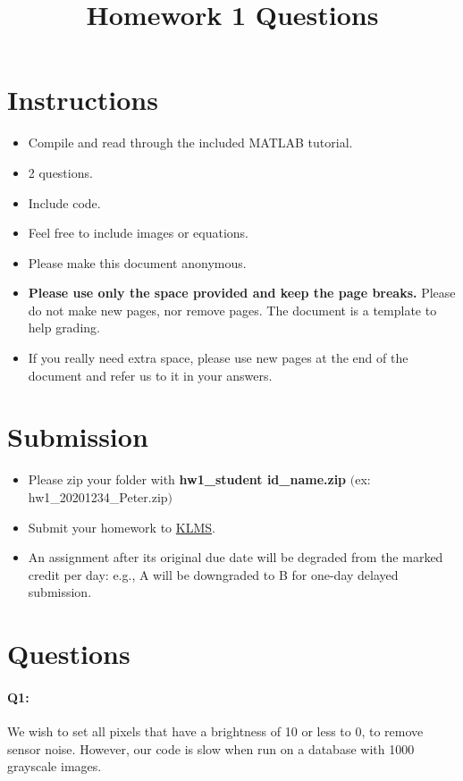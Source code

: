 \documentclass[11pt]{article}
\date{}
\title{\vspace{-1cm}Homework 1 Questions}
\begin{document}
\maketitle
\vspace{-2cm}
\thispagestyle{fancy}

\section*{Instructions}
\begin{itemize}
  \item Compile and read through the included MATLAB tutorial.
  \item 2 questions.
  \item Include code.
  \item Feel free to include images or equations.
  \item Please make this document anonymous.
  \item \textbf{Please use only the space provided and keep the page breaks.} Please do not make new pages, nor remove pages. The document is a template to help grading.
  \item If you really need extra space, please use new pages at the end of the document and refer us to it in your answers.
\end{itemize}


\section*{Submission}
\begin{itemize}
	\item Please zip your folder with \textbf{hw1\_student id\_name.zip} $($ex: hw1\_20201234\_Peter.zip$)$
	\item Submit your homework to \href{http://klms.kaist.ac.kr/course/view.php?id=109597}{KLMS}.
	\item An assignment after its original due date will be degraded from the marked credit per day: e.g., A will be downgraded to B for one-day delayed submission.
\end{itemize}

\pagebreak


\section*{Questions}



\paragraph{Q1:} We wish to set all pixels that have a brightness of 10 or less to 0, to remove sensor noise. However, our code is slow when run on a database with 1000 grayscale images.
\end{document}
